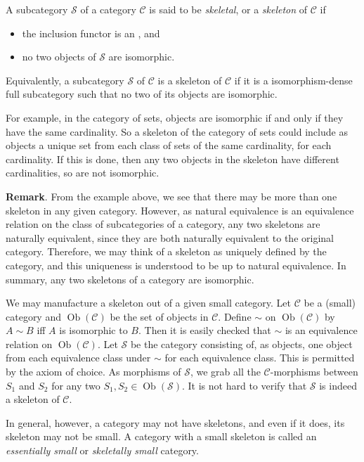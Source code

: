 \documentclass[12pt]{article}
\begin{document}
A subcategory $\mathcal{S}$ of a category $\mathcal{C}$ is said to be \emph{skeletal}, or a \emph{skeleton} of $\mathcal{C}$ if
\begin{itemize}
\item the inclusion functor is an , and
\item no two objects of $\mathcal{S}$ are isomorphic.
\end{itemize}
Equivalently, a subcategory $\mathcal{S}$ of $\mathcal{C}$ is a skeleton of $\mathcal{C}$ if it is a isomorphism-dense full subcategory such that no two of its objects are isomorphic.

For example, in the category of sets, objects are isomorphic if and only if they have the same cardinality.  So a skeleton of the category of sets could include as objects a unique set from each class of sets of the same cardinality, for each cardinality.  If this is done, then any two objects in the skeleton have different cardinalities, so are not isomorphic.

\textbf{Remark}.  From the example above, we see that there may be more than one skeleton in any given category.  However, as natural equivalence is an equivalence relation on the class of subcategories of a category, any two skeletons are naturally equivalent, since they are both naturally equivalent to the original category.  Therefore, we may think of a skeleton as uniquely defined by the category, and this uniqueness is understood to be up to natural equivalence.  In summary, any two skeletons of a category are isomorphic.

We may manufacture a skeleton out of a given small category.  Let $\mathcal{C}$ be a (small) category and $\operatorname{Ob}(\mathcal{C})$ be the set of objects in $\mathcal{C}$.  Define $\sim$ on $\operatorname{Ob}(\mathcal{C})$ by $A \sim B$ iff $A$ is isomorphic to $B$.  Then it is easily checked that $\sim$ is an equivalence relation on $\operatorname{Ob}(\mathcal{C})$.  Let $\mathcal{S}$ be the category consisting of, as objects, one object from each equivalence class under $\sim$ for each equivalence class.  This is permitted by the axiom of choice.  As morphisms of $\mathcal{S}$, we grab all the $\mathcal{C}$-morphisms between $S_1$ and $S_2$ for any two $S_1,S_2\in \operatorname{Ob}(\mathcal{S})$.  It is not hard to verify that $\mathcal{S}$ is indeed a skeleton of $\mathcal{C}$.

In general, however, a category may not have skeletons, and even if it does, its skeleton may not be small.  A category with a small skeleton is called an \emph{essentially small} or \emph{skeletally small} category.


\end{document}
